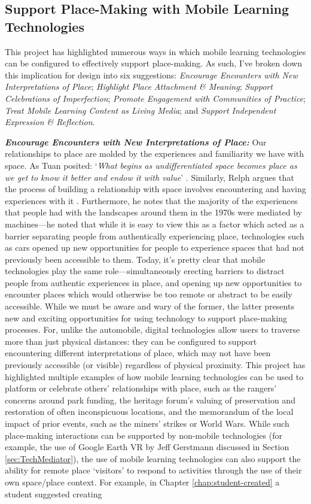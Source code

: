 \subsection{Support Place-Making with Mobile Learning Technologies}

This project has highlighted numerous ways in which mobile learning technologies can be configured to effectively support place-making. As such, I've broken down this implication for design into six suggestions: \textit{Encourage Encounters with New Interpretations of Place}; \textit{Highlight Place Attachment \& Meaning}; \textit{Support Celebrations of Imperfection}; \textit{Promote Engagement with Communities of Practice}; \textit{Treat Mobile Learning Content as Living Media}; and \textit{Support Independent Expression \& Reflection}.

\textbf{\textit{Encourage Encounters with New Interpretations of Place:}}  Our relationships to place are molded by the experiences and familiarity we have with space. As Tuan posited: `\textit{What begins as undifferentiated space becomes place as we get to know it better and endow it with value}' \citep{Tuan1978}. Similarly, Relph argues that the process of building a relationship with space involves encountering and having experiences with it \citep{Relph1976}. Furthermore, he notes that the majority of the experiences that people had with the landscapes around them in the 1970s were mediated by machines---he noted that while it is easy to view this as a factor which acted as a barrier separating people from authentically experiencing place, technologies such as cars opened up new opportunities for people to experience spaces that had not previously been accessible to them. Today, it's pretty clear that mobile technologies play the same role---simultaneously erecting barriers to distract people from authentic experiences in place, and opening up new opportunities to encounter places which would otherwise be too remote or abstract to be easily accessible. While we must be aware and wary of the former, the latter presents new and exciting opportunities for using technology to support place-making processes. For, unlike the automobile, digital technologies allow users to traverse more than just physical distances: they can be configured to support encountering different interpretations of place, which may not have been previously accessible (or visible) regardless of physical proximity. This project has highlighted multiple examples of how mobile learning technologies can be used to platform or celebrate others' relationships with place, such as the rangers' concerns around park funding, the heritage forum's valuing of preservation and restoration of often inconspicuous locations, and the memorandum of the local impact of prior events, such as the miners' strikes or World Wars. While such place-making interactions can be supported by non-mobile technologies (for example, the use of Google Earth VR by Jeff Gerstmann discussed in Section \ref{sec:TechMediator}), the use of mobile learning technologies can also support the ability for remote place `visitors' to respond to activities through the use of their own space/place context. For example, in Chapter \ref{chap:student-created} a student suggested creating 